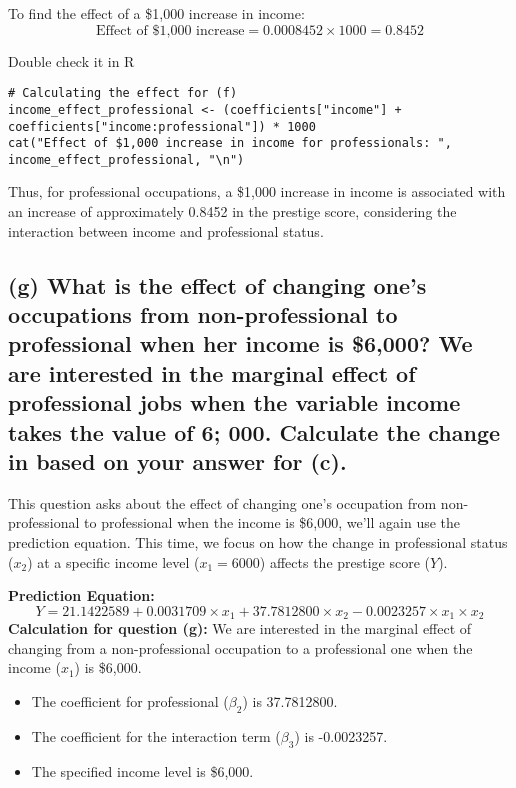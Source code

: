 \documentclass[12pt]{article}
\begin{document}
To find the effect of a \$1,000 increase in income:
\begin{equation}
    \text{Effect of \$1,000 increase} = 0.0008452 \times 1000 = 0.8452
\end{equation}

Double check it in R
\begin{lstlisting}
# Calculating the effect for (f)
income_effect_professional <- (coefficients["income"] + coefficients["income:professional"]) * 1000
cat("Effect of $1,000 increase in income for professionals: ", income_effect_professional, "\n")
\end{lstlisting}


Thus, for professional occupations, a \$1,000 increase in income is associated with an increase of approximately 0.8452 in the prestige score, considering the interaction between income and professional status.



 

\subsection{(g) What is the effect of changing one's occupations from non-professional to professional
when her income is \$6,000? We are interested in the marginal effect of professional jobs when the variable income takes the value of 6; 000. Calculate the change in  based on your answer for (c).}
This question asks about the effect of changing one's occupation from non-professional to professional when the income is \$6,000, we'll again use the prediction equation. This time, we focus on how the change in professional status (\(x_2\)) at a specific income level (\(x_1 = 6000\)) affects the prestige score (\(Y\)).

\textbf{Prediction Equation:}
\begin{equation}
    Y = 21.1422589 + 0.0031709 \times x_1 + 37.7812800 \times x_2 - 0.0023257 \times x_1 \times x_2
\end{equation}
\textbf{Calculation for question (g):}
We are interested in the marginal effect of changing from a non-professional occupation to a professional one when the income (\(x_1\)) is \$6,000.

\begin{itemize}
    \item The coefficient for professional (\( \beta_2 \)) is 37.7812800.
    \item The coefficient for the interaction term (\( \beta_3 \)) is -0.0023257.
    \item The specified income level is \$6,000.
\end{itemize}
\end{document}
